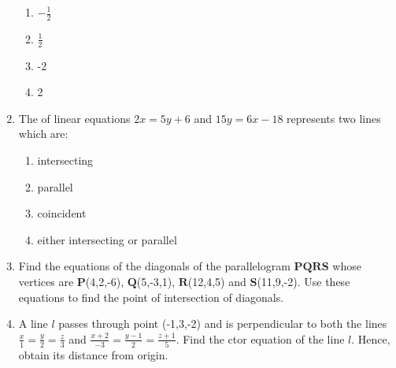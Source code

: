 \documentclass{article}
\let\vec\mathbf
\begin{document}
\begin{enumerate}
		\begin{enumerate}
			\item $-\frac{1}{2}$
			\item $\frac{1}{2}$
			\item -2
			\item 2
		\end{enumerate}

	\item The of linear equations $2x=5y+6$ and $15y=6x-18$ represents two lines which are:

			\begin{enumerate}
				\item intersecting
				\item parallel
				\item coincident
				\item either intersecting or parallel
			\end{enumerate}

		\item Find the equations of the diagonals of the parallelogram $\vec{PQRS}$ whose vertices are $\vec{P}$(4,2,-6), $\vec{Q}$(5,-3,1), $\vec{R}$(12,4,5) and $\vec{S}$(11,9,-2). Use these equations to find the point of intersection of diagonals.

	\item A line $l$ passes through point (-1,3,-2) and is perpendicular to both the lines $\frac {x}{1}=\frac{y}{2}=\frac{z}{3}$ and $\frac {x+2}{-3}=\frac{y-1}{2}=\frac{z+1}{5}$. Find the ctor equation of the line $l$. Hence, obtain its distance from origin.

\end{enumerate}
\end{document}
